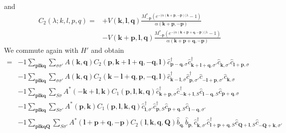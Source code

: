 and
\begin{align*}
	C_2(\lambda; k, l, p, q) =&+ V(\mathbf{k}, \mathbf{l}, \mathbf{q}) \frac{M_{-\mathbf{p}}^* \left(  e^{ - | \alpha (\mathbf{k}+\mathbf{p},-\mathbf{p}) | \lambda } - 1 \right)}{\alpha (\mathbf{k}+\mathbf{p}, -\mathbf{p})}\\
		& - V(\mathbf{k}+\mathbf{p}, \mathbf{l}, \mathbf{q}) \frac{M_{-\mathbf{p}}^* \left(  e^{ - | \alpha (\mathbf{k}+\mathbf{p}+\mathbf{q},-\mathbf{p}) | \lambda } - 1 \right)}{\alpha (\mathbf{k}+\mathbf{p}+\mathbf{q}, -\mathbf{p})}\end{align*}
We commute again with $H'$ and obtain
\begin{align*}
	[\eta, H'] = 	&-1 \sum_{ \mathbf{p} \mathbf{l} \mathbf{k} \mathbf{q} } \sum_{ \sigma \sigma' } A( \mathbf{k}, \mathbf{q} )  C_2( \mathbf{p}, \mathbf{k}+\mathbf{l}+\mathbf{q}, -\mathbf{q}, \mathbf{l} )   \hat{c}_{ \mathbf{p}-\mathbf{q}, \sigma }^\dagger  \hat{c}_{ \mathbf{k}+\mathbf{l}+\mathbf{q}, \sigma' }^\dagger  \hat{c}_{ \mathbf{k}, \sigma' }^{\phantom{\dagger}} \hat{c}_{ \mathbf{l}+\mathbf{p}, \sigma }^{\phantom{\dagger}}  \\
	&-1 \sum_{ \mathbf{p} \mathbf{l} \mathbf{k} \mathbf{q} } \sum_{ \sigma \sigma' } A( \mathbf{k}, \mathbf{q} )  C_2( \mathbf{k}-\mathbf{l}+\mathbf{q}, \mathbf{p}, -\mathbf{q}, \mathbf{l} )   \hat{c}_{ \mathbf{k}-\mathbf{l}, \sigma }^\dagger  \hat{c}_{ \mathbf{p}, \sigma' }^\dagger  \hat{c}_{ -\mathbf{l}+\mathbf{p}, \sigma' }^{\phantom{\dagger}} \hat{c}_{ \mathbf{k}, \sigma }^{\phantom{\dagger}}  \\
	&-1 \sum_{ \mathbf{p} \mathbf{l} \mathbf{k} \mathbf{q} } \sum_{ S \sigma } A^*( -\mathbf{k}+\mathbf{l}, \mathbf{k} )  C_1( \mathbf{p}, \mathbf{l}, \mathbf{k}, \mathbf{q} )   \hat{c}_{ \mathbf{k}+\mathbf{p}, \sigma }^\dagger  \hat{c}_{ -\mathbf{k}+\mathbf{l}, S }^\dagger  \hat{c}_{ \mathbf{l}-\mathbf{q}, S }^{\phantom{\dagger}} \hat{c}_{ \mathbf{p}+\mathbf{q}, \sigma }^{\phantom{\dagger}}  \\
	&-1 \sum_{ \mathbf{p} \mathbf{l} \mathbf{k} \mathbf{q} } \sum_{ S \sigma' } A^*( \mathbf{p}, \mathbf{k} )  C_1( \mathbf{p}, \mathbf{l}, \mathbf{k}, \mathbf{q} )   \hat{c}_{ \mathbf{l}, \sigma' }^\dagger  \hat{c}_{ \mathbf{p}, S }^\dagger  \hat{c}_{ \mathbf{p}+\mathbf{q}, S }^{\phantom{\dagger}} \hat{c}_{ \mathbf{l}-\mathbf{q}, \sigma' }^{\phantom{\dagger}}  \\
	&-1 \sum_{ \mathbf{p} \mathbf{l} \mathbf{k} \mathbf{q} \mathbf{Q} } \sum_{ S \sigma' } A^*( \mathbf{l}+\mathbf{p}+\mathbf{q}, -\mathbf{p} )  C_2( \mathbf{l}, \mathbf{k}, \mathbf{q}, \mathbf{Q} )   \hat{b}_{ \mathbf{q}, }^{\phantom{\dagger}} \hat{b}_{ \mathbf{p}, }^{\phantom{\dagger}} \hat{c}_{ \mathbf{k}, \sigma' }^\dagger  \hat{c}_{ \mathbf{l}+\mathbf{p}+\mathbf{q}, S }^\dagger  \hat{c}_{ \mathbf{Q}+\mathbf{l}, S }^{\phantom{\dagger}} \hat{c}_{ -\mathbf{Q}+\mathbf{k}, \sigma' }^{\phantom{\dagger}}  \\

\end{align*}
